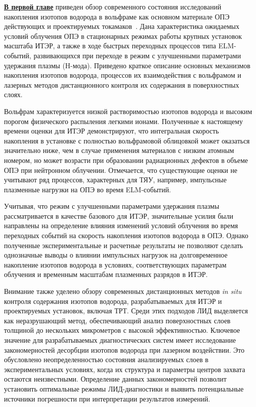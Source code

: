 \underline{\textbf{В первой главе}} приведен обзор современного состояния исследований накопления изотопов водорода в вольфраме как основном материале ОПЭ действующих и проектируемых токамаков~\cite{Roth2011,Pintsuk2012,Rieth2019}. Дана характеристика ожидаемых условий облучения ОПЭ в стационарных режимах работы крупных установок масштаба ИТЭР, а также в ходе быстрых переходных процессов типа ELM-событий, развивающихся при переходе в режим с улучшенными параметрами удержания плазмы (H-мода). Приведено краткое описание основных механизмов накопления изотопов водорода, процессов их взаимодействия с вольфрамом и лазерных методов дистанционного контроля их содержания в поверхностных слоях.

Вольфрам характеризуется низкой растворимостью изотопов водорода и высоким порогом физического распыления легкими ионами. Полученные к настоящему времени оценки для ИТЭР демонстрируют, что интегральная скорость накопления в установке с полностью вольфрамовой облицовкой может оказаться значительно ниже, чем в случае применения материалов с низким атомным номером, но может возрасти при образовании радиационных дефектов в объеме ОПЭ при нейтронном облучении. Отмечается, что существующие оценки не учитывают ряд процессов, характерных для ТЯУ, например, импульсные плазменные нагрузки на ОПЭ во время ELM-событий.

Учитывая, что режим с улучшенными параметрами удержания плазмы рассматривается в качестве базового для ИТЭР, значительные усилия были направлены на определение влияния изменений условий облучения во время переходных событий на скорость накопления изотопов водорода в ОПЭ. Однако полученные экспериментальные и расчетные результаты не позволяют сделать однозначные выводы о влиянии импульсных нагрузок на долговременное накопление изотопов водорода в условиях, соответствующих параметрам облучения и временным масштабам плазменных разрядов в ИТЭР.

Внимание также уделено обзору современных дистанционных методов \textit{in situ} контроля содержания изотопов водорода, разрабатываемых для ИТЭР и проектируемых установок, включая ТРТ. Среди этих подходов ЛИД выделяется как неразрушающий метод, обеспечивающий анализ поверхностных слоев толщиной до нескольких микрометров с высокой эффективностью. Ключевое значение для разрабатываемых диагностических систем имеет исследование закономерностей десорбции изотопов водорода при лазерном воздействии. Это обусловлено неопределенностью состояния анализируемых слоев в экспериментальных условиях, когда их структура и параметры центров захвата остаются неизвестными. Определение данных закономерностей позволит установить оптимальные режимы ЛИД-диагностики и выявить потенциальные источники погрешности при интерпретации результатов измерений.

